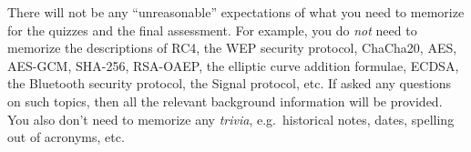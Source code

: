 There will not be any ``unreasonable'' expectations of what you need
to memorize for the quizzes and the final assessment. For example,
you do \emph{not} need to memorize the descriptions of RC4, the WEP
security protocol, ChaCha20, AES, AES-GCM, SHA-256,
RSA-OAEP, the elliptic curve addition formulae, ECDSA, the
Bluetooth security protocol, the Signal protocol, etc. If asked any
questions on such topics, then all the relevant background
information will be provided. You also don't need to memorize any
\emph{trivia}, e.g.\ historical notes, dates, spelling out of acronyms, etc.
